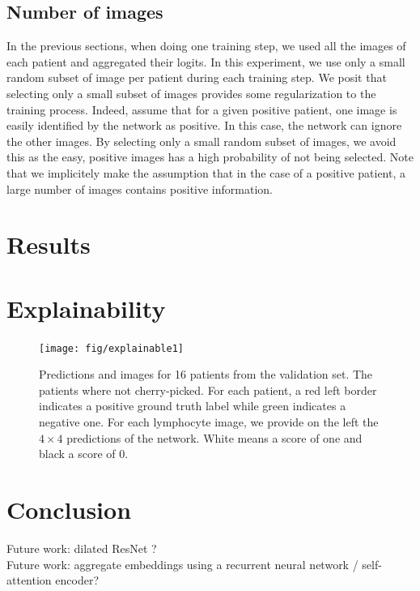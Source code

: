 \documentclass[final]{cvpr}
\begin{document}
\subsection{Number of images}
In the previous sections, when doing one training step, we used all the images of each patient and aggregated their logits.
In this experiment, we use only a small random subset of image per patient during each training step. 
We posit that selecting only a small subset of images provides some regularization to the training process. Indeed, assume that for a given positive patient, one image is easily identified by the network as positive. In this case, the network can ignore the other images. By selecting only a small random subset of images, we avoid this as the easy, positive images has a high probability of not being selected. Note that we implicitely make the assumption that in the case of a positive patient, a large number of images contains positive information.

	\section{Results}
	
	\section{Explainability}
	\begin{figure}[t]
		\begin{center}
			\texttt{[image: fig/explainable1]}
		\end{center}
		\caption{Predictions and images for 16 patients from the validation set. The patients where not cherry-picked. For each patient, a red left border indicates a positive ground truth label while green indicates a negative one. For each lymphocyte image, we provide on the left the $4\times 4$ predictions of the network. White means a score of one and black a score of 0.}
		\label{fig:resnet}
	\end{figure}
	
	\section{Conclusion}
	Future work: dilated ResNet ?\\
	Future work: aggregate embeddings using a recurrent neural network / self-attention encoder?
	
	\clearpage
	{\small
		
		
	}
\end{document}
